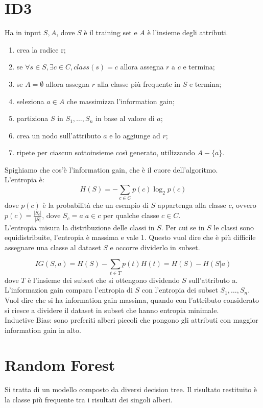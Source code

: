 \documentclass{article}
\begin{document}
\section{ID3}
Ha in input $S, A$, dove $S$ è il training set e $A$ è l'insieme degli
attributi.
\begin{enumerate}
	\item crea la radice r;
		
	\item se $\forall s \in S, \exists c \in C, class(s) = c$ allora
		assegna $r$ a $c$ e termina;

	\item se $A = \emptyset$ allora assegna $r$ alla classe più frequente in $S$
		e termina;

	\item seleziona $a \in A$ che massimizza l'information gain;

	\item partiziona $S$ in $S_1, \dots, S_n$ in base al valore di $a$;

	\item crea un nodo sull'attributo $a$ e lo aggiunge ad $r$;

	\item ripete per ciascun sottoinsieme così generato, utilizzando 
		$A - \{a\}$.
\end{enumerate}

Spighiamo che cos'è l'information gain, che è il cuore dell'algoritmo. \\
L'entropia è:
\begin{equation}
	H(S) = - \sum_{c \in C} p(c) \log_2 p(c)
\end{equation}
dove $p(c)$ è la probabilità che un esempio di $S$ appartenga alla classe $c$,
ovvero $p(c) = \frac{|S_c|}{|S|}$, dove $S_c = {a | a \in c}$ per qualche classe
$c \in C$. \\
L'entropia misura la distribuzione delle classi in $S$. Per cui se in $S$ le
classi sono equidistribuite, l'entropia è massima e vale 1. Questo vuol dire che
è più difficile assegnare una classe al dataset $S$ e occorre dividerlo in
subset. 

\begin{equation}
	IG(S, a) = H(S) - \sum_{t \in T} p(t) H(t) = H(S) - H(S|a)
\end{equation}
dove $T$ è l'insieme dei subset che si ottengono dividendo $S$ sull'attributo a.
L'informazion gain compara l'entropia di $S$ con l'entropia dei subset
$S_1, \dots, S_n$. Vuol dire che si ha information gain massima, quando con
l'attributo considerato si riesce a dividere il dataset in subset che hanno
entropia minimale. \\
Inductive Bias: sono preferiti alberi piccoli che pongono gli attributi con
maggior information gain in alto.

\section{Random Forest}
	Si tratta di un modello composto da diversi decision tree. Il risultato
	restituito è la classe più frequente tra i risultati dei singoli alberi.
\end{document}
